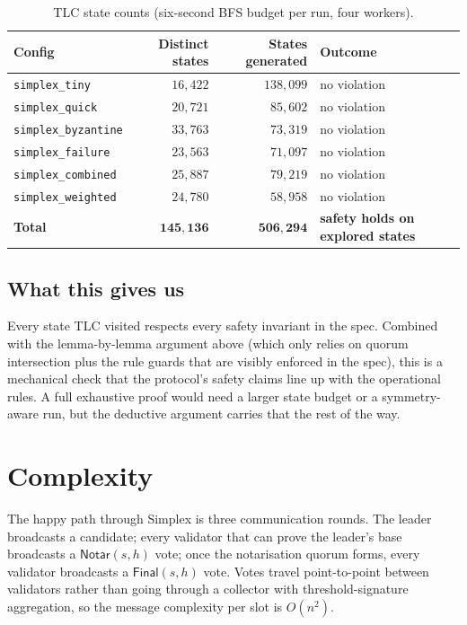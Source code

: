 \documentclass[11pt,a4paper]{article}
\newcommand{\Notar}{\mathsf{Notar}}
\newcommand{\Final}{\mathsf{Final}}
\begin{document}
\begin{table}[h]
\centering
\small
\begin{tabular}{lrrl}
\toprule
Config & Distinct states & States generated & Outcome \\
\midrule
\texttt{simplex\_tiny}      & $16{,}422$  & $138{,}099$ & no violation \\
\texttt{simplex\_quick}     & $20{,}721$  & $\phantom{0}85{,}602$ & no violation \\
\texttt{simplex\_byzantine} & $33{,}763$  & $\phantom{0}73{,}319$ & no violation \\
\texttt{simplex\_failure}   & $23{,}563$  & $\phantom{0}71{,}097$ & no violation \\
\texttt{simplex\_combined}  & $25{,}887$  & $\phantom{0}79{,}219$ & no violation \\
\texttt{simplex\_weighted}  & $24{,}780$  & $\phantom{0}58{,}958$ & no violation \\
\midrule
\textbf{Total}              & $\mathbf{145{,}136}$ & $\mathbf{506{,}294}$ & \textbf{safety holds on explored states} \\
\bottomrule
\end{tabular}
\caption{TLC state counts (six-second BFS budget per run, four
workers).}
\label{tab:tlc}
\end{table}

\subsection{What this gives us}

Every state TLC visited respects every safety invariant in the spec.
Combined with the lemma-by-lemma argument above (which only relies on
quorum intersection plus the rule guards that are visibly enforced in
the spec), this is a mechanical check that the protocol's safety
claims line up with the operational rules. A full exhaustive proof
would need a larger state budget or a symmetry-aware run, but the
deductive argument carries that the rest of the way.

\section{Complexity}\label{sec:complexity}

The happy path through Simplex is three communication rounds. The
leader broadcasts a candidate; every validator that can prove the
leader's base broadcasts a $\Notar(s,h)$ vote; once the notarisation
quorum forms, every validator broadcasts a $\Final(s,h)$ vote. Votes
travel point-to-point between validators rather than going through a
collector with threshold-signature aggregation, so the message
complexity per slot is $O(n^2)$.
\end{document}
